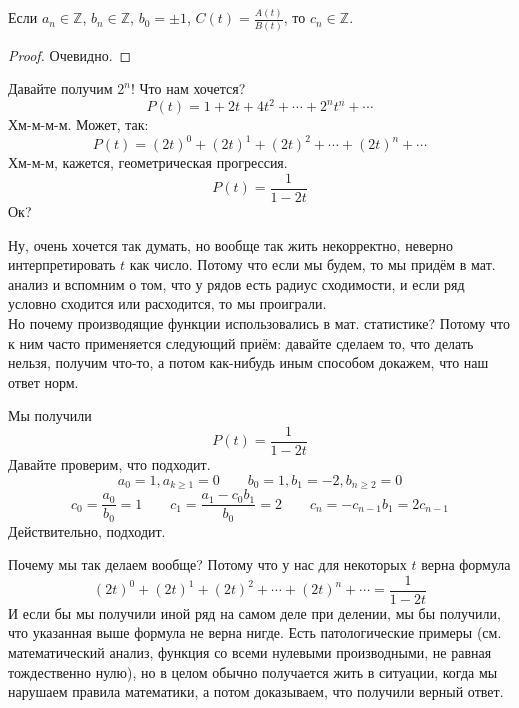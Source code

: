 \documentclass{article}
\begin{document}
    \begin{claim}
        Если $a_n\in\mathbb Z$, $b_n\in\mathbb Z$, $b_0=\pm1$, $C(t)=\frac{A(t)}{B(t)}$, то $c_n\in\mathbb Z$.
    \end{claim}
    \begin{proof}
        Очевидно.
    \end{proof}
    \begin{example}
        Давайте получим $2^n$! Что нам хочется?
        $$
        P(t)=1+2t+4t^2+\cdots+2^nt^n+\cdots
        $$
        Хм-м-м-м. Может, так:
        $$
        P(t)=(2t)^0+(2t)^1+(2t)^2+\cdots+(2t)^n+\cdots
        $$
        Хм-м-м, кажется, геометрическая прогрессия.
        $$
        P(t)=\frac1{1-2t}
        $$
        Ок?
    \end{example}
    \begin{remark}
        Ну, очень хочется так думать, но вообще так жить некорректно, неверно интерпретировать $t$ как число. Потому что если мы будем, то мы придём в мат. анализ и вспомним о том, что у рядов есть радиус сходимости, и если ряд условно сходится или расходится, то мы проиграли.\\
        Но почему производящие функции использовались в мат. статистике? Потому что к ним часто применяется следующий приём: давайте сделаем то, что делать нельзя, получим что-то, а потом как-нибудь иным способом докажем, что наш ответ норм.
    \end{remark}
    \begin{example}
        Мы получили
        $$
        P(t)=\frac1{1-2t}
        $$
        Давайте проверим, что подходит.
        $$
        a_0=1,a_{k\geqslant1}=0\qquad b_0=1,b_1=-2,b_{n\geqslant2}=0
        $$
        $$
        c_0=\frac{a_0}{b_0}=1\qquad c_1=\frac{a_1-c_0b_1}{b_0}=2\qquad c_n=-c_{n-1}b_1=2c_{n-1}
        $$
        Действительно, подходит.
    \end{example}
    \begin{remark}
        Почему мы так делаем вообще? Потому что у нас для некоторых $t$ верна формула
        $$
        (2t)^0+(2t)^1+(2t)^2+\cdots+(2t)^n+\cdots=\frac1{1-2t}
        $$
        И если бы мы получили иной ряд на самом деле при делении, мы бы получили, что указанная выше формула не верна нигде. Есть патологические примеры (см. математический анализ, функция со всеми нулевыми производными, не равная тождественно нулю), но в целом обычно получается жить в ситуации, когда мы нарушаем правила математики, а потом доказываем, что получили верный ответ.
    \end{remark}
\end{document}
